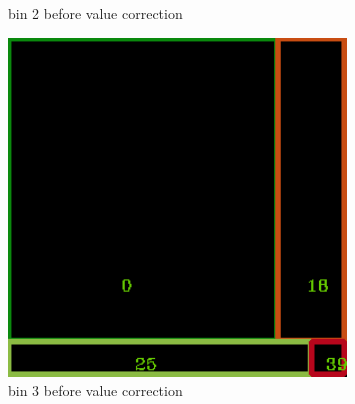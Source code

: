 \documentclass[11pt]{article}
\begin{document}
\begin{figure}
\begin{minipage}[htb]{0.33\linewidth}
    \caption{bin 2 before value correction}
    \label{skyline}
    \end{minipage}
    \begin{minipage}[htb]{0.33\linewidth}
    \centering
    \includegraphics[width=0.8\textwidth]{FIGS/1/output3.png}
    \caption{bin 3 before value correction}
    \label{skyline}
    \end{minipage}
    \end{figure}
\end{document}
